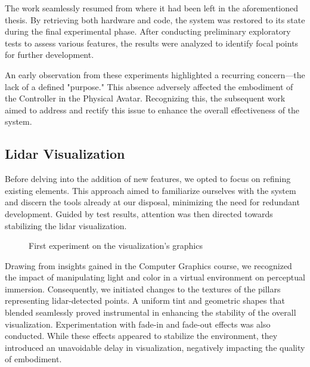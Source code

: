 \documentclass{Configuration_Files/PoliMi3i_thesis}
\begin{document}
The work seamlessly resumed from where it had been left in the aforementioned thesis. By retrieving both hardware and code, the system was restored to its state during the final experimental phase. After conducting preliminary exploratory tests to assess various features, the results were analyzed to identify focal points for further development.

An early observation from these experiments highlighted a recurring concern—the lack of a defined "purpose." This absence adversely affected the embodiment of the Controller in the Physical Avatar. Recognizing this, the subsequent work aimed to address and rectify this issue to enhance the overall effectiveness of the system.

\subsection{Lidar Visualization}
Before delving into the addition of new features, we opted to focus on refining existing elements. This approach aimed to familiarize ourselves with the system and discern the tools already at our disposal, minimizing the need for redundant development. Guided by test results, attention was then directed towards stabilizing the lidar visualization.

\begin{figure}[H]
    \centering
    \quad
    \caption{First experiment on the visualization's graphics}
    \label{fig:quadtree2}
\end{figure}

Drawing from insights gained in the Computer Graphics course, we recognized the impact of manipulating light and color in a virtual environment on perceptual immersion. Consequently, we initiated changes to the textures of the pillars representing lidar-detected points. A uniform tint and geometric shapes that blended seamlessly proved instrumental in enhancing the stability of the overall visualization. Experimentation with fade-in and fade-out effects was also conducted. While these effects appeared to stabilize the environment, they introduced an unavoidable delay in visualization, negatively impacting the quality of embodiment.
\end{document}
